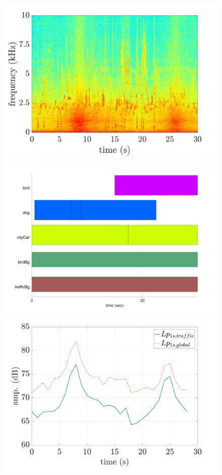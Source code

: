 \documentclass[twocolumn,a4paper,10pt]{article}
\begin{document}
\begin{figure}
\centering
   \begin{minipage}[c]{.32\linewidth}
      \includegraphics[width =\linewidth]{../image/spectrogramExample.pdf}
   \end{minipage}
   \begin{minipage}[c]{.32\linewidth}
      \includegraphics[width =\linewidth]{../image/animals_10-pianoRoll.png}
   \end{minipage}
   \begin{minipage}[c]{.32\linewidth}
      \includegraphics[width =\linewidth]{../image/evolutionLpExample.pdf}


\end{minipage}
\end{figure}
\end{document}
